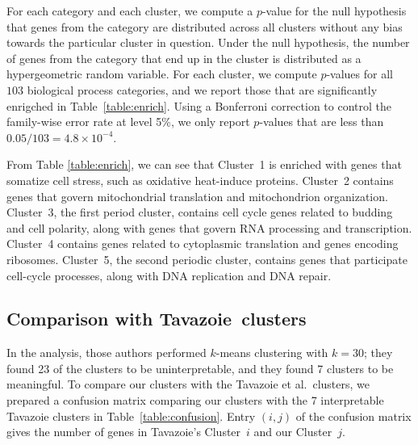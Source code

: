 \documentclass[12pt]{article}
\begin{document}
For each category and each cluster, we compute a $p$-value for the null
hypothesis that genes from the category are distributed across all clusters
without any bias towards the particular cluster in question. Under the null
hypothesis, the number of genes from the category that end up in the cluster
is distributed as a hypergeometric random variable. For each cluster, we
compute $p$-values for all $103$ biological process categories, and we report
those that are significantly enrigched in Table~\ref{table:enrich}.  Using a
Bonferroni correction to control the family-wise error rate at level 5\%, we
only report $p$-values that are less than $0.05 / 103 = 4.8\times10^{-4}$.




From Table \ref{table:enrich}, we can see that Cluster~1 is enriched with
genes that somatize cell stress, such as oxidative heat-induce proteins.
Cluster~2 contains genes that govern mitochondrial translation and
mitochondrion organization. Cluster~3, the first period cluster, contains cell
cycle genes related to budding and cell polarity, along with genes that govern
RNA processing and transcription. Cluster~4 contains genes related to
cytoplasmic translation and genes encoding ribosomes. Cluster~5, the second
periodic cluster, contains genes that participate cell-cycle processes, along
with DNA replication and DNA repair.



\subsection{Comparison with Tavazoie~clusters}

In the \citet{tavazoie1999systematic} analysis, those authors performed
$k$-means clustering with $k = 30$; they found 23 of the clusters to be
uninterpretable, and they found 7 clusters to be meaningful. To compare our
clusters with the Tavazoie et al.\ clusters, we prepared a confusion matrix
comparing our clusters with the 7 interpretable Tavazoie clusters in
Table~\ref{table:confusion}.
Entry $(i,j)$ of the confusion matrix gives the number of genes in
Tavazoie's Cluster~$i$ and our Cluster~$j$. 
\end{document}
